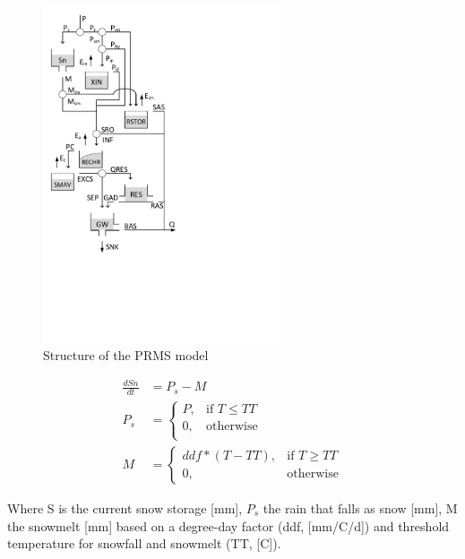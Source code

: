 { 																	%
\begin{figure}
\includegraphics[trim=1cm 8cm 7cm 1cm,width=7cm,keepaspectratio]{./AppA_files/45_schematic.pdf}
\caption{Structure of the PRMS model} \label{fig:45_schematic}
\end{figure}

\begin{align}
	\frac{dSn}{dt} &= P_s-M \\
	P_s &= \begin{cases}
		P, &\text{if } T \leq TT \\
		0, & \text{otherwise} \\
	\end{cases} \\
	M &= 
	\begin{cases}
		ddf*(T - TT), & \text{if } T \geq TT \\
		0, & \text{otherwise}
	\end{cases}
\end{align}

Where S is the current snow storage [mm], $P_s$ the rain that falls as snow [mm], M the snowmelt [mm] based on a degree-day factor (ddf, [mm/\degree C/d]) and threshold temperature for snowfall and snowmelt (TT, [\degree C]).

} %

